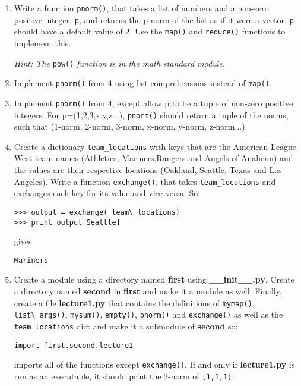 \documentclass{report}
\begin{document}
\begin{enumerate}
	\item Write a function \verb|pnorm()|, that takes a list of numbers and a non-zero positive integer, \verb|p|, and returns the p-norm of the list as if it were a vector. \verb|p| should have a default value of 2. Use the \verb|map()| and \verb|reduce()| functions to implement this.

\emph{Hint: The }\verb|pow()| \emph{function is in the math standard module.}

	\item Implement \verb|pnorm()| from 4 using list comprehensions instead of \verb|map()|.

	\item Implement \verb|pnorm()| from 4, except allow p to be a tuple of non-zero positive integers. For p=(1,2,3,x,y,z...), \verb|pnorm()| should return a tuple of the norms, such that (1-norm, 2-norm, 3-norm, x-norm, y-norm, z-norm...).

	\item Create a dictionary \verb|team_locations| with keys that are the American League West team names (Athletics, Mariners,Rangers and Angels of Anaheim) and the values are their respective locations (Oakland, Seattle, Texas and Los Angeles). Write a function \verb|exchange()|, that takes \verb|team_locations| and exchanges each key for its value and vice versa. So:

\begin{verbatim}
>>> output = exchange( team\_locations)
>>> print output[Seattle]
\end{verbatim}
gives

\verb|Mariners|
	

	\item Create a module using a directory named \textbf{first} using \textbf{\_\_init\_\_.py}. Create a directory named \textbf{second} in \textbf{first} and make it a module as well. Finally, create a file \textbf{lecture1.py} that contains the definitions of \verb|mymap()|, \verb|list\_args()|, \verb|mysum()|, \verb|empty()|, \verb|pnorm()| and \verb|exchange()| as well as the \verb|team_locations| dict and make it a submodule of \textbf{second} so:

\verb|import first.second.lecture1|

imports all of the functions except \verb|exchange()|. If and only if \textbf{lecture1.py} is run as an executable, it should print the 2-norm of \verb|[1,1,1]|.

\end{enumerate}
\end{document}
